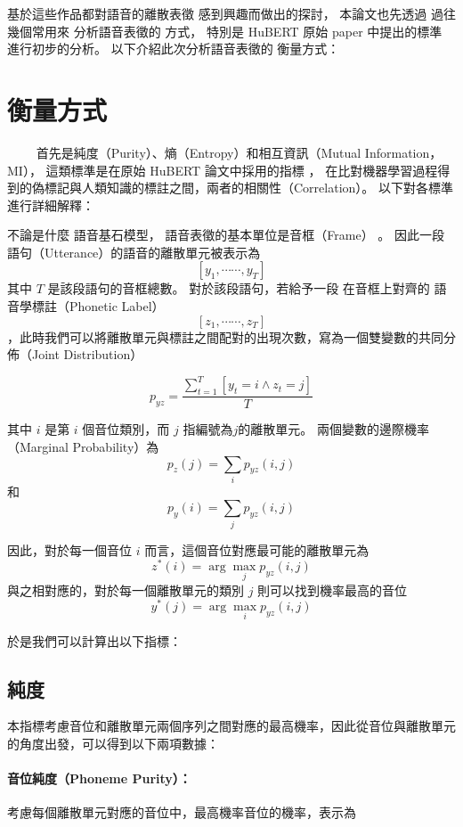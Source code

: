 基於這些作品都對語音的離散表徵
感到興趣而做出的探討，
本論文也先透過
過往幾個常用來
分析語音表徵的
方式，
特別是
HuBERT 原始 paper 中提出的標準
進行初步的分析。
以下介紹此次分析語音表徵的
衡量方式：

\section{衡量方式}

　　
首先是純度（Purity）、熵（Entropy）和相互資訊（Mutual Information，MI），
這類標準是在原始 HuBERT 論文中採用的指標 \cite{hsu_hubert_2021, hsu_hubert_2021-2}，
在比對機器學習過程得到的偽標記與人類知識的標註之間，兩者的相關性（Correlation）。
以下對各標準進行詳細解釋：


不論是什麼
語音基石模型，
語音表徵的基本單位是音框（Frame）
。
因此一段語句（Utterance）的語音的離散單元被表示為
$$[y_1, \cdots\cdots, y_T]$$
其中 $T$ 是該段語句的音框總數。
對於該段語句，若給予一段
在音框上對齊的
語音學標註（Phonetic Label）
$$[z_1, \cdots\cdots, z_T]$$
，此時我們可以將離散單元與標註之間配對的出現次數，寫為一個雙變數的共同分佈（Joint Distribution）

$$
p_{yz} = 
\frac{
\sum^T_{t=1}
[
{y_t = i 
\wedge
z_t = j}
]
}
{T}$$

其中 $i$ 是第 $i$ 個音位類別，而 $j$ 指編號為$j$的離散單元。
兩個變數的邊際機率（Marginal Probability）為
$$p_z(j)=\sum_i{p_{yz}(i, j)}$$
和
$$p_y(i)=\sum_j{p_{yz}(i, j)}$$

因此，對於每一個音位 $i$ 而言，這個音位對應最可能的離散單元為
 $$z^\ast(i) = \arg\max_j p_{yz}(i, j)$$
與之相對應的，對於每一個離散單元的類別 $j$ 則可以找到機率最高的音位
$$y^\ast(j) = \arg\max_i p_{yz}(i,j)$$

於是我們可以計算出以下指標：

\subsection{純度}

本指標考慮音位和離散單元兩個序列之間對應的最高機率，因此從音位與離散單元的角度出發，可以得到以下兩項數據：


\paragraph{
音位純度（Phoneme Purity）：}
考慮每個離散單元對應的音位中，最高機率音位的機率，表示為


